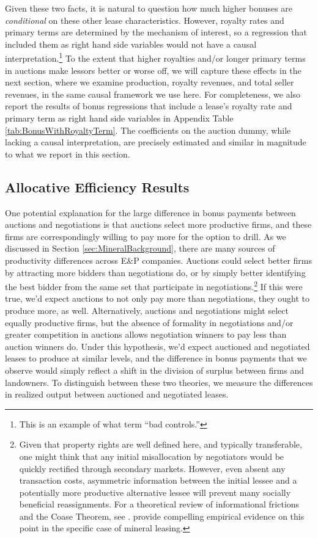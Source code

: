 Given these two facts, it is natural to question how much higher bonuses are \emph{conditional} on these other lease characteristics. However, royalty rates and primary terms are determined by the mechanism of interest, so a regression that included them as right hand side variables would not have a causal interpretation.\footnote{This is an example of what \citet{angrist2008mostly} term ``bad controls.''} To the extent that higher royalties and/or longer primary terms in auctions make lessors better or worse off, we will capture these effects in the next section, where we examine production, royalty revenues, and total seller revenues, in the same causal framework we use here.  For completeness, we also report the results of bonus regressions that include a lease's royalty rate and primary term as right hand side variables in Appendix Table \ref{tab:BonusWithRoyaltyTerm}.  The coefficients on the auction dummy, while lacking a causal interpretation, are precisely estimated and similar in magnitude to what we report in this section. 

\subsection{Allocative Efficiency Results \label{sec:ResultsProductivity}}

One potential explanation for the large difference in bonus payments between auctions and negotiations is that auctions select more productive firms, and these firms are correspondingly willing to pay more for the option to drill. As we discussed in Section \ref{sec:MineralBackground}, there are many sources of productivity differences across E\&P companies. Auctions could select better firms by attracting more bidders than negotiations do, or by simply better identifying the best bidder from the same set that participate in negotiations.\footnote{Given that property rights are well defined here, and typically transferable, one might think that any initial misallocation by negotiators would be quickly rectified through secondary markets. However, even absent any transaction costs, asymmetric information between the initial lessee and a potentially more productive alternative lessee will prevent many socially beneficial reassignments. For a theoretical review of informational frictions and the Coase Theorem, see \citet{Farrell1987-df}. \cite{BrehmLewis} provide compelling empirical evidence on this point in the specific case of mineral leasing.} If this were true, we'd expect auctions to not only pay more than negotiations, they ought to produce more, as well.  Alternatively, auctions and negotiations might select equally productive firms, but the absence of formality in negotiations and/or greater competition in auctions allows negotiation winners to pay less than auction winners do.  Under this hypothesis, we'd expect auctioned and negotiated leases to produce at similar levels, and the difference in bonus payments that we observe would simply reflect a shift in the division of surplus between firms and landowners. To distinguish between these two theories, we measure the differences in realized output between auctioned and negotiated leases. 


